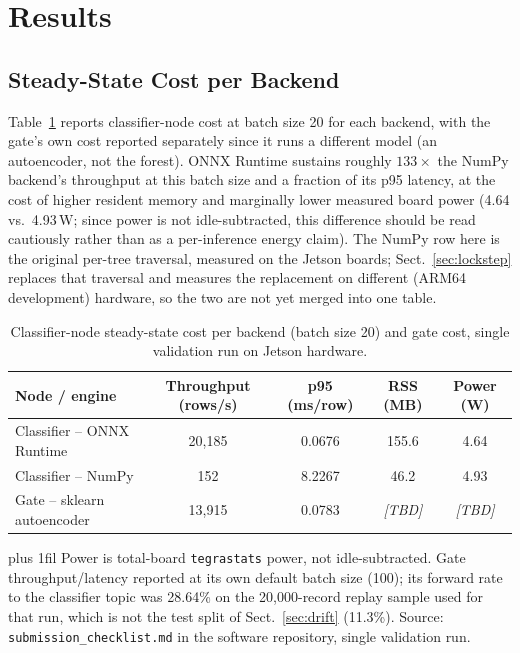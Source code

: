\documentclass[runningheads]{llncs}
\newcommand{\ph}[1]{{\color{gray}\textit{[#1]}}}
\newcommand{\tabnote}[1]{%
  \vspace{4pt}\par\noindent
  \begin{minipage}{\textwidth}%
    \footnotesize\parindent=0pt\leftskip=0pt\rightskip=0pt\parfillskip=0pt plus 1fil\relax
    #1%
  \end{minipage}}
\begin{document}
\section{Results}
\label{sec:results}

\subsection{Steady-State Cost per Backend}

Table~\ref{tab:engines} reports classifier-node cost at batch size 20 for each backend, with the gate's own cost reported separately since it runs a different model (an autoencoder, not the forest). ONNX Runtime sustains roughly $133\times$ the NumPy backend's throughput at this batch size and a fraction of its p95 latency, at the cost of higher resident memory and marginally lower measured board power (4.64 vs.\ 4.93\,W; since power is not idle-subtracted, this difference should be read cautiously rather than as a per-inference energy claim). The NumPy row here is the original per-tree traversal, measured on the Jetson boards; Sect.~\ref{sec:lockstep} replaces that traversal and measures the replacement on different (ARM64 development) hardware, so the two are not yet merged into one table.

\begin{table}[htbp]
  \caption{Classifier-node steady-state cost per backend (batch size 20) and gate cost, single validation run on Jetson hardware.}
  \label{tab:engines}
  \centering
  \small
  \begin{tabular}{l c c c c}
    \toprule
    Node / engine & Throughput (rows/s) & p95 (ms/row) & RSS (MB) & Power (W) \\
    \midrule
    Classifier -- ONNX Runtime & 20{,}185 & 0.0676 & 155.6 & 4.64 \\
    Classifier -- NumPy        & 152     & 8.2267 & 46.2  & 4.93 \\
    Gate -- sklearn autoencoder & 13{,}915 & 0.0783 & \ph{TBD} & \ph{TBD} \\
    \bottomrule
  \end{tabular}
  \tabnote{Power is total-board \texttt{tegrastats} power, not idle-subtracted. Gate throughput/latency reported at its own default batch size (100); its forward rate to the classifier topic was 28.64\% on the 20{,}000-record replay sample used for that run, which is not the test split of Sect.~\ref{sec:drift} (11.3\%). Source: \texttt{submission\_checklist.md} in the software repository, single validation run.}
\end{table}
\end{document}
